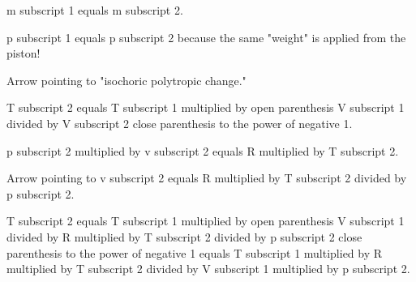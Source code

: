 m subscript 1 equals m subscript 2.  

p subscript 1 equals p subscript 2 because the same "weight" is applied from the piston!  

Arrow pointing to "isochoric polytropic change."  

T subscript 2 equals T subscript 1 multiplied by open parenthesis V subscript 1 divided by V subscript 2 close parenthesis to the power of negative 1.  

p subscript 2 multiplied by v subscript 2 equals R multiplied by T subscript 2.  

Arrow pointing to v subscript 2 equals R multiplied by T subscript 2 divided by p subscript 2.  

T subscript 2 equals T subscript 1 multiplied by open parenthesis V subscript 1 divided by R multiplied by T subscript 2 divided by p subscript 2 close parenthesis to the power of negative 1 equals T subscript 1 multiplied by R multiplied by T subscript 2 divided by V subscript 1 multiplied by p subscript 2.